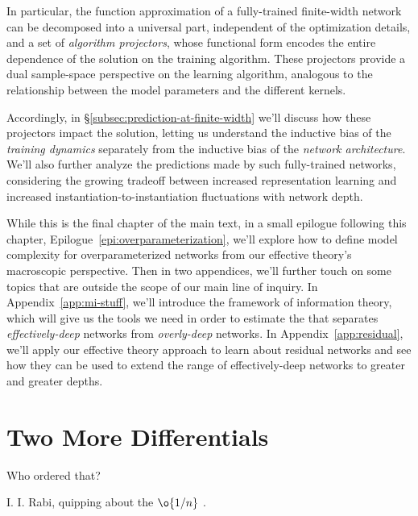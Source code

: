 In particular, the function approximation of a fully-trained finite-width network can be decomposed into a universal part, independent of the optimization details, and a set of \emph{algorithm projectors}, whose functional form encodes the entire dependence of the solution on the training algorithm. 
These projectors provide a dual sample-space perspective on the learning algorithm, analogous to the relationship between the model parameters and the different kernels.

Accordingly, in  \S\ref{subsec:prediction-at-finite-width} we'll discuss how these projectors impact the solution, letting us understand the inductive bias of the \emph{training dynamics} separately from the inductive bias of the \emph{network architecture}. We'll also further analyze the predictions made by such fully-trained networks, considering the growing tradeoff between increased representation learning and increased instantiation-to-instantiation fluctuations with network depth.


While this is the final chapter of the main text, in a small epilogue following this chapter, Epilogue~\ref{epi:overparameterization}, we'll explore 
how to define model complexity for overparameterized networks from our effective theory's macroscopic perspective. Then in two appendices, we'll further touch on some topics that are outside the scope of our main line of inquiry. In Appendix~\ref{app:mi-stuff}, we'll introduce the framework of information theory, which will give us the tools we need in order 
to estimate the  that separates \emph{effectively-deep} networks from \emph{overly-deep} networks. In Appendix~\ref{app:residual}, we'll apply our effective theory approach to learn about residual networks and see how they can be used to extend the range of effectively-deep networks to greater and greater depths.








\section{Two More Differentials}\label{sec:ddNTKs}
\epigraph{Who ordered that?}{I. I. Rabi, quipping about the $\o{1/n}$ .
}


